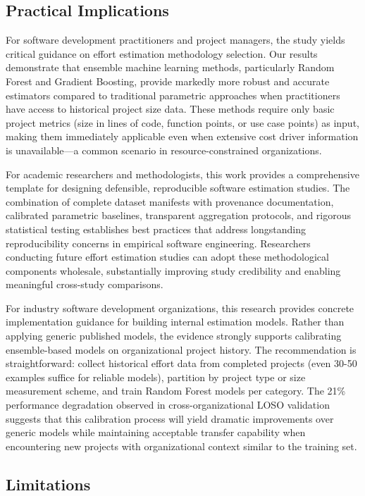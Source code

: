 \documentclass[11pt,a4paper]{article}
\begin{document}
\subsection{Practical Implications}

For software development practitioners and project managers, the study yields critical guidance on effort estimation methodology selection. Our results demonstrate that ensemble machine learning methods, particularly Random Forest and Gradient Boosting, provide markedly more robust and accurate estimators compared to traditional parametric approaches when practitioners have access to historical project size data. These methods require only basic project metrics (size in lines of code, function points, or use case points) as input, making them immediately applicable even when extensive cost driver information is unavailable---a common scenario in resource-constrained organizations.

For academic researchers and methodologists, this work provides a comprehensive template for designing defensible, reproducible software estimation studies. The combination of complete dataset manifests with provenance documentation, calibrated parametric baselines, transparent aggregation protocols, and rigorous statistical testing establishes best practices that address longstanding reproducibility concerns in empirical software engineering. Researchers conducting future effort estimation studies can adopt these methodological components wholesale, substantially improving study credibility and enabling meaningful cross-study comparisons.

For industry software development organizations, this research provides concrete implementation guidance for building internal estimation models. Rather than applying generic published models, the evidence strongly supports calibrating ensemble-based models on organizational project history. The recommendation is straightforward: collect historical effort data from completed projects (even 30-50 examples suffice for reliable models), partition by project type or size measurement scheme, and train Random Forest models per category. The 21\% performance degradation observed in cross-organizational LOSO validation suggests that this calibration process will yield dramatic improvements over generic models while maintaining acceptable transfer capability when encountering new projects with organizational context similar to the training set.

\subsection{Limitations}
\end{document}
